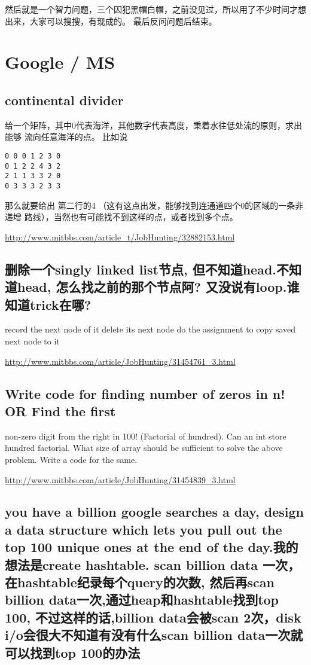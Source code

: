 \documentclass[12pt]{book}
\begin{document}
然后就是一个智力问题，三个囚犯黑帽白帽，之前没见过，所以用了不少时间才想出来，大家可以搜搜，有现成的。 最后反问问题后结束。

\chapter{Google / MS}
\label{sec-13}

\section{continental divider}
\label{sec-13-1}
给一个矩阵，其中0代表海洋，其他数字代表高度，秉着水往低处流的原则，求出能够
流向任意海洋的点。 比如说
\lstset{language=java,label= ,caption= ,numbers=none}
\begin{lstlisting}
0 0 0 1 2 3 0
0 1 2 2 4 3 2
2 1 1 3 3 2 0
0 3 3 3 2 3 3
\end{lstlisting}

那么就要给出 第二行的4 （这有这点出发，能够找到连通道四个0的区域的一条非递增
路线），当然也有可能找不到这样的点，或者找到多个点。

\url{http://www.mitbbs.com/article_t/JobHunting/32882153.html}

\section{删除一个singly linked list节点, 但不知道head.不知道head, 怎么找之前的那个节点阿? 又没说有loop.谁知道trick在哪?}
\label{sec-13-2}

record the next node of it delete its next node do the assignment to copy saved next node to it 

\url{http://www.mitbbs.com/article/JobHunting/31454761_3.html}

\section{Write code for finding number of zeros in n! OR Find the first}
\label{sec-13-3}
non-zero digit from the right in 100! (Factorial of hundred). Can an
int store hundred factorial. What size of array should be sufficient to solve the above problem. Write a code for the same.

\url{http://www.mitbbs.com/article/JobHunting/31454839_3.html}

\section{you have a billion google searches a day, design a data structure which lets you pull out the top 100 unique ones at the end of the day.我的想法是create hashtable. scan billion data 一次，在hashtable纪录每个query的次数, 然后再scan billion data一次,通过heap和hashtable找到top 100, 不过这样的话,billion data会被scan 2次，disk i/o会很大不知道有没有什么scan billion data一次就可以找到top 100的办法}
\label{sec-13-4}
\end{document}
